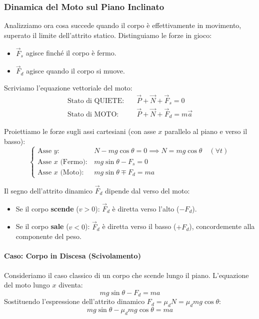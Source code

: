 
\subsubsection{Dinamica del Moto sul Piano Inclinato}
Analizziamo ora cosa succede quando il corpo è effettivamente in movimento, superato il limite dell'attrito statico.
Distinguiamo le forze in gioco:
\begin{itemize}
    \item $\vec{F}_s$ agisce finché il corpo è fermo.
    \item $\vec{F}_d$ agisce quando il corpo si muove.
\end{itemize}

Scriviamo l'equazione vettoriale del moto:
\begin{align}
    \text{Stato di QUIETE:} \quad & \vec{P} + \vec{N} + \vec{F}_s = 0 \\
    \text{Stato di MOTO:} \quad & \vec{P} + \vec{N} + \vec{F}_d = m\vec{a}
\end{align}

Proiettiamo le forze sugli assi cartesiani (con asse $x$ parallelo al piano e verso il basso):
\begin{equation}
\begin{cases}
    \text{Asse } y: & N - mg \cos\theta = 0 \implies N = mg \cos\theta \quad (\forall t) \\
    \text{Asse } x \text{ (Fermo)}: & mg \sin\theta - F_s = 0 \\
    \text{Asse } x \text{ (Moto)}: & mg \sin\theta \mp F_d = ma
\end{cases}
\end{equation}

Il segno dell'attrito dinamico $\vec{F}_d$ dipende dal verso del moto:
\begin{itemize}
    \item Se il corpo \textbf{scende} ($v > 0$): $\vec{F}_d$ è diretta verso l'alto ($-F_d$).
    \item Se il corpo \textbf{sale} ($v < 0$): $\vec{F}_d$ è diretta verso il basso ($+F_d$), concordemente alla componente del peso.
\end{itemize}

\paragraph{Caso: Corpo in Discesa (Scivolamento)}
Consideriamo il caso classico di un corpo che scende lungo il piano. L'equazione del moto lungo $x$ diventa:
\[ mg \sin\theta - F_d = ma \]
Sostituendo l'espressione dell'attrito dinamico $F_d = \mu_d N = \mu_d mg \cos\theta$:
\[ mg \sin\theta - \mu_d mg \cos\theta = ma \]

